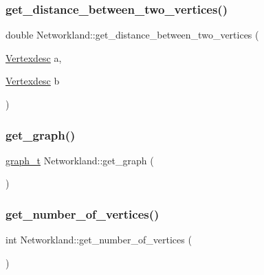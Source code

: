\mbox{\label{classNetworkland_a8bd3817fe681bf6516bcbb5766f0c389}} 
\subsubsection{\texorpdfstring{get\+\_\+distance\+\_\+between\+\_\+two\+\_\+vertices()}{get\_distance\_between\_two\_vertices()}}
{\footnotesize\ttfamily double Networkland\+::get\+\_\+distance\+\_\+between\+\_\+two\+\_\+vertices (\begin{DoxyParamCaption}\item[{\hyperlink{Networkland_8h_af340ced64bd0b6914662d1b26be70b41}{Vertexdesc}}]{a,  }\item[{\hyperlink{Networkland_8h_af340ced64bd0b6914662d1b26be70b41}{Vertexdesc}}]{b }\end{DoxyParamCaption})}

\mbox{\label{classNetworkland_a603e68baf499b857ed7e6c0194d97116}} 
\subsubsection{\texorpdfstring{get\+\_\+graph()}{get\_graph()}}
{\footnotesize\ttfamily \hyperlink{Networkland_8h_a15c13903d8f520e4339ca612a1ee2652}{graph\+\_\+t} Networkland\+::get\+\_\+graph (\begin{DoxyParamCaption}{ }\end{DoxyParamCaption})}

\mbox{\label{classNetworkland_aee6ec50ecb1defd9d46d78268031d389}} 
\subsubsection{\texorpdfstring{get\+\_\+number\+\_\+of\+\_\+vertices()}{get\_number\_of\_vertices()}}
{\footnotesize\ttfamily int Networkland\+::get\+\_\+number\+\_\+of\+\_\+vertices (\begin{DoxyParamCaption}{ }\end{DoxyParamCaption})}



